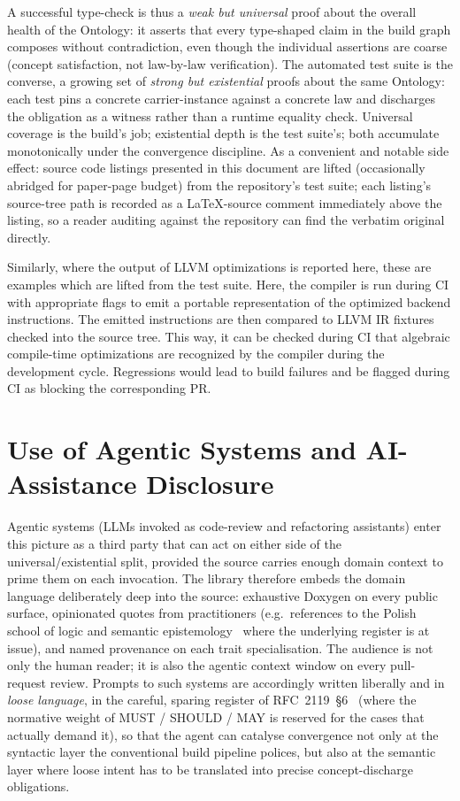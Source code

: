 \documentclass[11pt, a4paper]{article}
\begin{document}
A successful type-check is thus a \emph{weak but universal} proof about the overall health of the Ontology: it asserts that every type-shaped claim in the build graph composes without contradiction, even though the individual assertions are coarse (concept satisfaction, not law-by-law verification).
The automated test suite is the converse, a growing set of \emph{strong but existential} proofs about the same Ontology: each test pins a concrete carrier-instance against a concrete law and discharges the obligation as a  witness rather than a runtime equality check.
Universal coverage is the build's job; existential depth is the test suite's; both accumulate monotonically under the convergence discipline.
As a convenient and notable side effect: source code listings presented in this document are lifted (occasionally abridged for paper-page budget) from the repository's test suite; each listing's source-tree path is recorded as a LaTeX-source comment immediately above the listing, so a reader auditing against the repository can find the verbatim original directly.

Similarly, where the output of LLVM optimizations is reported here, these are examples which are lifted from the test suite.
Here, the compiler is run during CI with appropriate flags to emit a portable representation of the optimized backend instructions.
The emitted instructions are then compared to LLVM IR fixtures checked into the source tree.
This way, it can be checked during CI that algebraic compile-time optimizations are recognized by the compiler during the development cycle.
Regressions would lead to build failures and be flagged during CI as blocking the corresponding PR.


\clearpage
\section{Use of Agentic Systems and AI-Assistance Disclosure}

Agentic systems (LLMs invoked as code-review and refactoring assistants) enter this picture as a third party that can act on either side of the universal/existential split, provided the source carries enough domain context to prime them on each invocation.
The library therefore embeds the domain language deliberately deep into the source: exhaustive Doxygen on every public surface, opinionated quotes from practitioners (e.g.\ references to the Polish school of logic and semantic epistemology~\cite{ajdukiewicz1985jezyk} where the underlying register is at issue), and named provenance on each trait specialisation.
The audience is not only the human reader; it is also the agentic context window on every pull-request review.
Prompts to such systems are accordingly written liberally and in \emph{loose language}, in the careful, sparing register of RFC~2119~§6~\cite{bradner1997rfc2119} (where the normative weight of \textsc{MUST} / \textsc{SHOULD} / \textsc{MAY} is reserved for the cases that actually demand it), so that the agent can catalyse convergence not only at the syntactic layer the conventional build pipeline polices, but also at the semantic layer where loose intent has to be translated into precise concept-discharge obligations.
\end{document}

